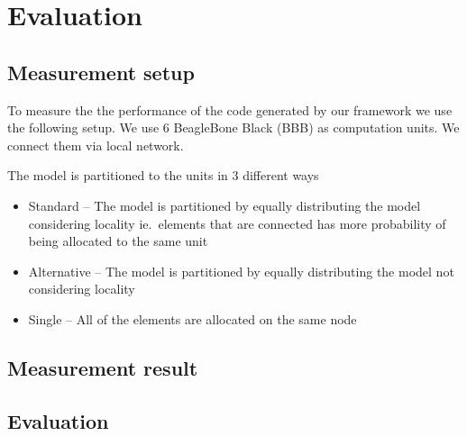 
\chapter{Evaluation}


\section{Measurement setup}

To measure the the performance of the code generated by our framework we use the following setup. We use 6 BeagleBone Black (BBB) \cite{BBB} as computation units. We connect them via local network. 

The model is partitioned to the units in 3 different ways 
\begin{itemize}
	\item Standard -- The model is partitioned by equally distributing the model considering locality ie.\ elements that are connected has more probability of being allocated to the same unit
	\item Alternative -- The model is partitioned by equally distributing the model not considering locality
	\item Single -- All of the elements are allocated on the same node
\end{itemize}

\section{Measurement result}








\section{Evaluation}